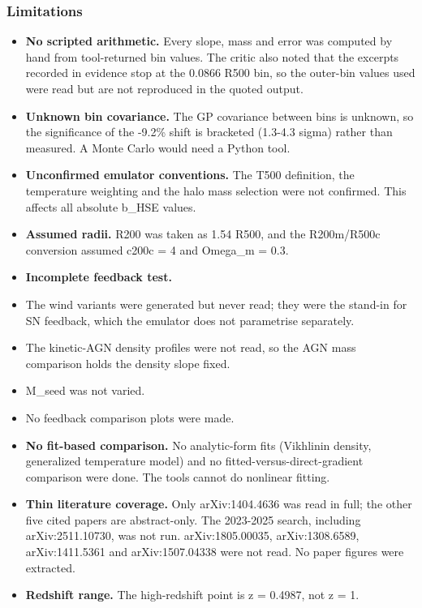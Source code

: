 \documentclass[11pt,a4paper]{article}
\begin{document}
\subsubsection*{Limitations}
\begin{itemize}
  \item \textbf{No scripted arithmetic.} Every slope, mass and error was computed by hand from tool-returned bin values. The critic also noted that the excerpts recorded in evidence stop at the 0.0866 R500 bin, so the outer-bin values used were read but are not reproduced in the quoted output.
  \item \textbf{Unknown bin covariance.} The GP covariance between bins is unknown, so the significance of the -9.2\% shift is bracketed (1.3-4.3 sigma) rather than measured. A Monte Carlo would need a Python tool.
  \item \textbf{Unconfirmed emulator conventions.} The T500 definition, the temperature weighting and the halo mass selection were not confirmed. This affects all absolute b\_HSE values.
  \item \textbf{Assumed radii.} R200 was taken as 1.54 R500, and the R200m/R500c conversion assumed c200c = 4 and Omega\_m = 0.3.
  \item \textbf{Incomplete feedback test.}
  \item The wind variants were generated but never read; they were the stand-in for SN feedback, which the emulator does not parametrise separately.
  \item The kinetic-AGN density profiles were not read, so the AGN mass comparison holds the density slope fixed.
  \item M\_seed was not varied.
  \item No feedback comparison plots were made.
  \item \textbf{No fit-based comparison.} No analytic-form fits (Vikhlinin density, generalized temperature model) and no fitted-versus-direct-gradient comparison were done. The tools cannot do nonlinear fitting.
  \item \textbf{Thin literature coverage.} Only arXiv:1404.4636 was read in full; the other five cited papers are abstract-only. The 2023-2025 search, including arXiv:2511.10730, was not run. arXiv:1805.00035, arXiv:1308.6589, arXiv:1411.5361 and arXiv:1507.04338 were not read. No paper figures were extracted.
  \item \textbf{Redshift range.} The high-redshift point is z = 0.4987, not z = 1.
\end{itemize}
\end{document}
